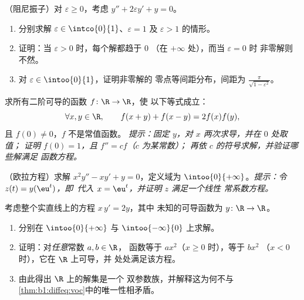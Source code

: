 \begin{exercise}[$\star\star\star$]\label{exo:b1:diffeq:9}
（阻尼振子）对 $\varepsilon \geq 0$，考虑
$y'' + 2\varepsilon y' + y = 0$。
\begin{enumerate}
  \item 分别求解 $\varepsilon \in \intco{0}{1}$、$\varepsilon = 1$
        及 $\varepsilon > 1$ 的情形。
  \item 证明：当 $\varepsilon > 0$ 时，每个解都趋于 $0$
        （在 $+\infty$ 处），而当 $\varepsilon = 0$ 时
        非零解则不然。
  \item 对 $\varepsilon \in \intoo{0}{1}$，证明非零解的
        零点等间距分布，间距为
        $\frac{\pi}{\sqrt{1 - \varepsilon^2}}$。
\end{enumerate}
\end{exercise}

\begin{exercise}[$\star\star\star$]\label{exo:b1:diffeq:10}
求所有二阶可导的函数 $f \colon \R \to \R$，使
以下等式成立：
\[
\forall x, y \in \R, \qquad f(x + y) + f(x - y) = 2 f(x) f(y),
\]
且 $f(0) \ne 0$，$f$ 不是常值函数。
\emph{提示：固定 $y$，对 $x$ 两次求导，并在 $0$ 处取值；
证明 $f(0) = 1$，且 $f'' = c f$（$c$ 为某常数）；
再依 $c$ 的符号求解，并验证哪些解满足
函数方程。}
\end{exercise}

\begin{exercise}[$\star\star$]\label{exo:b1:diffeq:11}
（欧拉方程）求解 $x^2 y'' - x y' + y = 0$，定义域为
$\intoo{0}{+\infty}$。\emph{提示：令 $z(t) = y(\eu^t)$，即\
代入 $x = \eu^t$，并证明 $z$ 满足一个线性
常系数方程。}
\end{exercise}

\begin{exercise}[$\star\star\star$]\label{exo:b1:diffeq:12}
考虑整个实直线上的方程 $x\,y' = 2y$，其中
未知的可导函数为 $y \colon \R \to \R$。
\begin{enumerate}
  \item 分别在 $\intoo{0}{+\infty}$ 与 $\intoo{-\infty}{0}$ 上求解。
  \item 证明：对\emph{任意}常数 $a, b \in \R$，
        函数等于 $ax^2$（$x \geq 0$ 时），等于 $bx^2$
        （$x < 0$ 时），它在 $\R$ 上可导，并
        处处满足该方程。
  \item 由此得出 $\R$ 上的解集是一个
        双参数族，并解释这为何不与
        \cref{thm:b1:diffeq:voc}中的唯一性相矛盾。
\end{enumerate}
\end{exercise}

